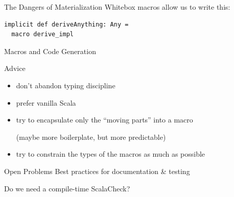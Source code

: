 \documentclass{beamer}
\begin{document}
\begin{frame}[fragile]{The Dangers of Materialization}
  Whitebox macros allow us to write this:
  \vspace{1em}

  \begin{verbatim}
implicit def deriveAnything: Any =
  macro derive_impl
  \end{verbatim}
\end{frame}

\begin{frame}{Macros and Code Generation}
  \begin{block}{Advice}
    \begin{itemize}
      \item don't abandon typing discipline
      \item prefer vanilla Scala
      \item try to encapsulate only the ``moving parts'' into a macro

        (maybe more boilerplate, but more predictable)
      \item try to constrain the types of the macros as much as possible
    \end{itemize}
  \end{block}
  \vspace{1em}

  \begin{block}{Open Problems}
    Best practices for documentation \& testing
    \vspace{1em}

    Do we need a compile-time ScalaCheck?
  \end{block}
\end{frame}

\begin{frame}
\vskip40pt
\begin{center}
\end{center}
\end{frame}

\begin{frame}
\vskip40pt
\begin{center}
\end{center}
\end{frame}
\end{document}
